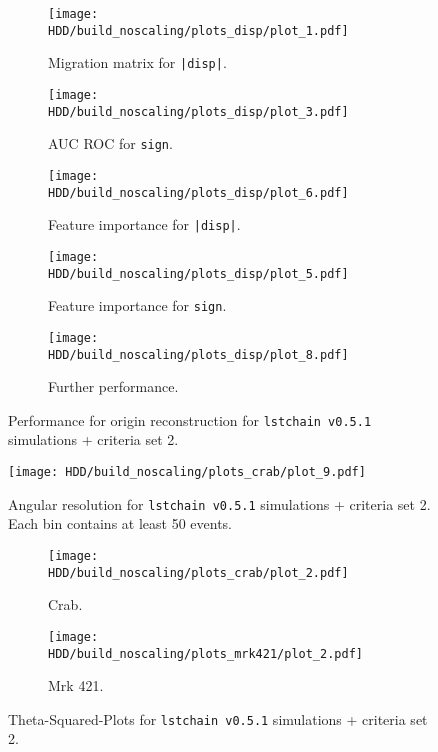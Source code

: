 \begin{figure}
    \centering
    \begin{subfigure}{0.49\textwidth}
        \centering
        \texttt{[image: HDD/build\_noscaling/plots\_disp/plot\_1.pdf]}
        \caption{Migration matrix for \texttt{|disp|}.}
    \end{subfigure}
    \hfill
    \begin{subfigure}{0.49\textwidth}
        \centering
        \texttt{[image: HDD/build\_noscaling/plots\_disp/plot\_3.pdf]}
        \caption{AUC ROC for \texttt{sign}.}
    \end{subfigure}
    \newline\vfill
    \begin{subfigure}{0.49\textwidth}
        \centering
        \texttt{[image: HDD/build\_noscaling/plots\_disp/plot\_6.pdf]}
        \caption{Feature importance for \texttt{|disp|}.}
    \end{subfigure}
    \hfill
    \begin{subfigure}{0.49\textwidth}
        \centering
        \texttt{[image: HDD/build\_noscaling/plots\_disp/plot\_5.pdf]}
        \caption{Feature importance for \texttt{sign}.}
    \end{subfigure}
    \newline\vfill
    \begin{subfigure}{0.49\textwidth}
        \centering
        \texttt{[image: HDD/build\_noscaling/plots\_disp/plot\_8.pdf]}
        \caption{Further performance.}
    \end{subfigure}
    \caption{Performance for origin reconstruction for \texttt{lstchain v0.5.1} simulations + criteria set 2.}
    \label{fig:origin_oldMC_150}
\end{figure}

\begin{figure}
    \centering
    \texttt{[image: HDD/build\_noscaling/plots\_crab/plot\_9.pdf]}
    \caption{Angular resolution for \texttt{lstchain v0.5.1} simulations + criteria set 2.
        Each bin contains at least 50 events.
    }
    \label{fig:ang_res_oldMC_150}
\end{figure}

\begin{figure}
    \centering
    \begin{subfigure}{0.49\textwidth}
        \centering
        \texttt{[image: HDD/build\_noscaling/plots\_crab/plot\_2.pdf]}
        \caption{Crab.}
        \label{fig:crab_oldMC_150}
    \end{subfigure}
    \hfill
    \begin{subfigure}{0.49\textwidth}
        \centering
        \texttt{[image: HDD/build\_noscaling/plots\_mrk421/plot\_2.pdf]}
        \caption{Mrk 421.}
        \label{fig:mrk_oldMC_150}
    \end{subfigure}
    \caption{Theta-Squared-Plots for \texttt{lstchain v0.5.1} simulations + criteria set 2.}
    \label{fig:obs_oldMC_150}
\end{figure}